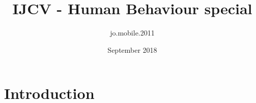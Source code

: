 \documentclass{article}
\title{IJCV - Human Behaviour special}
\author{jo.mobile.2011 }
\date{September 2018}
\begin{document}
\maketitle

\section{Introduction}
\end{document}
